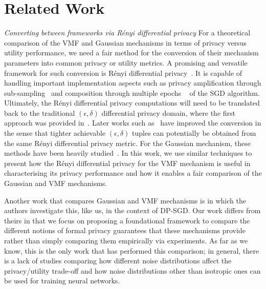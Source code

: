 \section{Related Work}
\label{sec:lit-rev}


    

    

\emph{Converting between frameworks via R\'enyi differential privacy}
For a theoretical comparison of the VMF and Gaussian mechanisms in terms of privacy versus utility performance, we need a fair method for the conversion of their mechanism parameters into common privacy or utility metrics. 
A promising and versatile framework for such conversion is  R\'enyi differential privacy~\citep{mironov:2017:CSF}. It is capable of handling important implementation aspects such as privacy amplification through sub-sampling~\citep{ mironov2019r, zhu2019poission,balle2018privacy,wang2019subsampled} and composition through multiple epochs ~\citep{abadi-etal:2016:CCS,Shahab_ISIT_2020:100rounds} of the SGD algorithm. Ultimately, the R\'enyi differential privacy computations will need to be translated back to the traditional $(\epsilon,\delta)$ differential privacy domain, where the first approach was provided in~\citep{mironov:2017:CSF}. Later works such as~\citep{Canonne_Kamath_Steinke_2022,Shahab_ISIT_2020:100rounds} have improved the conversion in the sense that tighter achievable $(\epsilon,\delta)$ tuples can potentially be obtained from the same R\'enyi differential privacy metric. For the Gaussian mechanism, these methods have been heavily studied~\citep{abadi-etal:2016:CCS, mironov2019r,Shahab_ISIT_2020:100rounds}. In this work, we use similar techniques to present how the R\'enyi differential privacy for the VMF mechanism is useful in characterising its privacy performance and how it enables a fair comparison of the Gaussian and VMF mechanisms. 

Another work that compares Gaussian and VMF mechanisms is \cite{faustini2023directional} in which the authors investigate this, like us, in the context of DP-SGD. Our work differs from theirs in that we focus on proposing a foundational framework to compare the different notions of formal privacy guarantees that these mechanisms provide rather than simply comparing them empirically via experiments. 
As far as we know, this is the only work that has performed this comparison; in general, there is a lack of studies comparing how different noise distributions affect the privacy/utility trade-off and how noise distributions other than isotropic ones can be used for training neural networks. 

